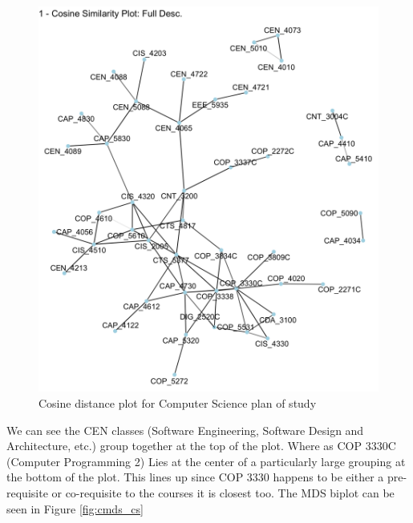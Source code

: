 \begin{figure}[H]
  \centering
  
  \includegraphics[width = .8\textwidth, height = .7\textheight]{Content/images/cos_cs.png}
  \caption{Cosine distance plot for Computer Science plan of study}
  \label{fig:cos_cs}
\end{figure}

We can see the CEN classes (Software Engineering, Software Design and Architecture, etc.) group together at the top of the plot. 
Where as COP 3330C (Computer Programming 2) Lies at the center of a particularly large grouping at the bottom of the plot. 
This lines up since COP 3330 happens to be either a pre-requisite or co-requisite to the courses it is closest too. The MDS 
biplot can be seen in Figure \ref{fig:cmds_cs}

